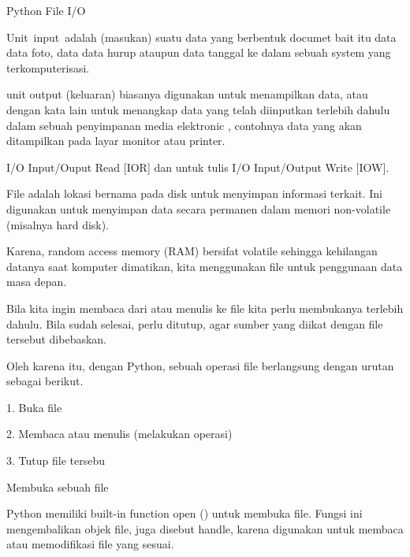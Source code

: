 Python File I/O \par
Unit~input~adalah (masukan) suatu  data yang berbentuk documet bait itu data data foto, data data hurup ataupun data tanggal ke dalam sebuah system yang  terkomputerisasi.  \par
unit output (keluaran) biasanya digunakan untuk menampilkan data, atau dengan kata lain untuk menangkap data yang telah diinputkan terlebih dahulu dalam sebuah penyimpanan media elektronic , contohnya data yang akan ditampilkan pada layar monitor atau printer. \par
I/O Input/Ouput Read [IOR] dan untuk tulis I/O Input/Output Write [IOW]. \par
\vspace{12pt}
\vspace{12pt}
\vspace{12pt}
File adalah lokasi bernama pada disk untuk menyimpan informasi terkait. Ini digunakan untuk menyimpan data secara permanen dalam memori non-volatile (misalnya hard disk). \par
\vspace{12pt}
Karena, random access memory (RAM) bersifat volatile sehingga kehilangan datanya saat komputer dimatikan, kita menggunakan file untuk penggunaan data masa depan. \par
\vspace{12pt}
Bila kita ingin membaca dari atau menulis ke file kita perlu membukanya terlebih dahulu. Bila sudah selesai, perlu ditutup, agar sumber yang diikat dengan file tersebut dibebaskan. \par
\vspace{12pt}
Oleh karena itu, dengan Python, sebuah operasi file berlangsung dengan urutan sebagai berikut. \par
\vspace{12pt}
1. \hspace*{0.5in} Buka file \par
2. \hspace*{0.5in} Membaca atau menulis (melakukan operasi) \par
3. \hspace*{0.5in} Tutup file tersebu \par
\vspace{12pt}
\vspace{12pt}
\vspace{12pt}
Membuka sebuah file \par
Python memiliki built-in function open () untuk membuka file. Fungsi ini mengembalikan objek file, juga disebut handle, karena digunakan untuk membaca atau memodifikasi file yang sesuai. \par
